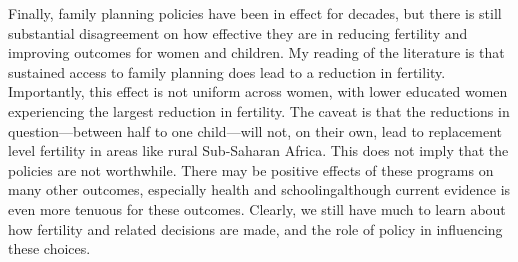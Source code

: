 \documentclass[letterpaper,12pt]{article}
\begin{document}
Finally, family planning policies have been in effect for decades, but
there is still substantial disagreement on how effective they are in
reducing fertility and improving outcomes for women and children. 
My reading of the literature is that sustained access to family planning
does lead to a reduction in fertility. 
Importantly, this effect is not uniform across women, with lower
educated women experiencing the largest reduction in fertility. 
The caveat is that the reductions in question---between half to one
child---will not, on their own, lead to replacement level fertility in
areas like rural Sub-Saharan Africa. 
This does not imply that the policies are not worthwhile. 
There may be positive effects of these programs on many other outcomes,
especially health and schoolingalthough current evidence is even more
tenuous for these outcomes. 
Clearly, we still have much to learn about how fertility and related
decisions are made, and the role of policy in influencing these choices.



\end{document}
